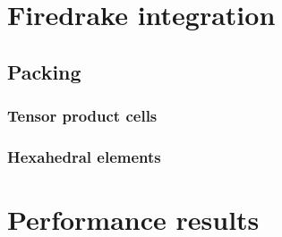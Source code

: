\documentclass[thesis]{subfiles}
\begin{document}


\chapter{Firedrake integration}




\section{Packing}
\subsection{Tensor product cells}
\subsection{Hexahedral elements}



\chapter{Performance results}

\end{document}
